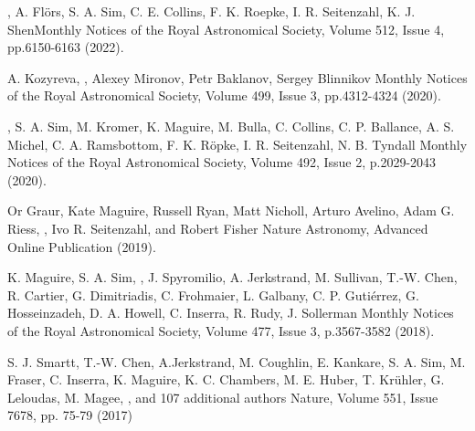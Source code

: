 {, A. Flörs, S. A. Sim, C. E. Collins, F. K. Roepke, I. R. Seitenzahl, K. J. Shen}{Monthly Notices of the Royal Astronomical Society, Volume 512, Issue 4, pp.6150-6163 (2022).}

{A. Kozyreva, , Alexey Mironov, Petr Baklanov, Sergey Blinnikov}
{Monthly Notices of the Royal Astronomical Society, Volume 499, Issue 3, pp.4312-4324 (2020).}

{, S. A. Sim, M. Kromer, K. Maguire, M. Bulla, C. Collins, C. P. Ballance, A. S. Michel, C. A. Ramsbottom, F. K. R\"opke, I. R. Seitenzahl, N. B. Tyndall}
{Monthly Notices of the Royal Astronomical Society, Volume 492, Issue 2, p.2029-2043 (2020).}

{Or Graur, Kate Maguire, Russell Ryan, Matt Nicholl, Arturo Avelino, Adam G. Riess, , Ivo R. Seitenzahl, and Robert Fisher}
{Nature Astronomy, Advanced Online Publication (2019).}

{K. Maguire, S. A. Sim, , J. Spyromilio, A. Jerkstrand, M. Sullivan, T.-W. Chen, R. Cartier, G. Dimitriadis, C. Frohmaier, L. Galbany, C. P. Gutiérrez, G. Hosseinzadeh, D. A. Howell, C. Inserra, R. Rudy, J. Sollerman}
{Monthly Notices of the Royal Astronomical Society, Volume 477, Issue 3, p.3567-3582 (2018).}

{S. J. Smartt, T.-W. Chen, A.Jerkstrand, M. Coughlin, E. Kankare, S. A. Sim, M. Fraser, C. Inserra, K. Maguire, K. C. Chambers,
M. E. Huber, T. Kr\"uhler, G. Leloudas, M. Magee, , and 107 additional authors}
{Nature, Volume 551, Issue 7678, pp. 75-79 (2017)}

